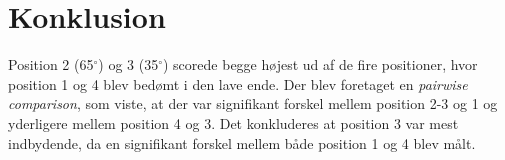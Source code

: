 \section*{Konklusion}
\label{Conlusion}

Position 2 (65$^{\circ}$) og 3 (35$^{\circ}$) scorede begge højest ud af de fire positioner, hvor position 1 og 4 blev bedømt i den lave ende. Der blev foretaget en \textit{pairwise comparison}, som viste, at der var signifikant forskel mellem position 2-3 og 1 og yderligere mellem position 4 og 3. Det konkluderes at position 3 var mest indbydende, da en signifikant forskel mellem både position 1 og 4 blev målt.